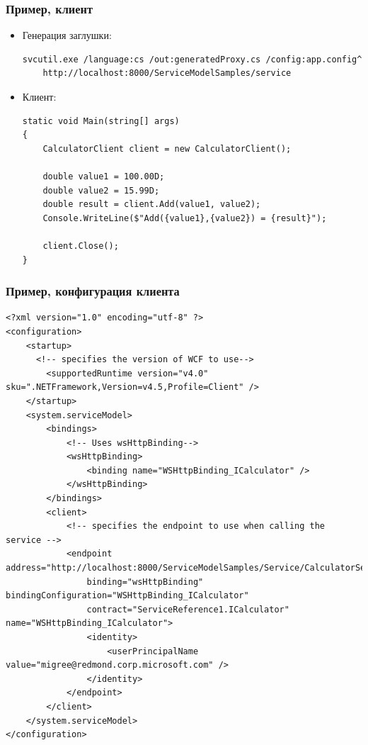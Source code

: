 \documentclass[xetex,mathserif,serif]{beamer}
\begin{document}
	\begin{frame}[fragile]
		\frametitle{Пример, клиент}
		\begin{itemize}
			\item Генерация заглушки: 
				\begin{scriptsize}
					\begin{verbatim}
svcutil.exe /language:cs /out:generatedProxy.cs /config:app.config^
    http://localhost:8000/ServiceModelSamples/service
					\end{verbatim}
				\end{scriptsize}
			\item Клиент:
				\begin{footnotesize}
					\begin{verbatim}
static void Main(string[] args)
{
    CalculatorClient client = new CalculatorClient();

    double value1 = 100.00D;
    double value2 = 15.99D;
    double result = client.Add(value1, value2);
    Console.WriteLine($"Add({value1},{value2}) = {result}");

    client.Close();
}
					\end{verbatim}
				\end{footnotesize}
		\end{itemize}
	\end{frame}

	\begin{frame}[fragile]
		\frametitle{Пример, конфигурация клиента}
		\begin{ssmall}
			\begin{verbatim}
<?xml version="1.0" encoding="utf-8" ?>  
<configuration>  
    <startup>   
      <!-- specifies the version of WCF to use-->  
        <supportedRuntime version="v4.0" sku=".NETFramework,Version=v4.5,Profile=Client" />  
    </startup>  
    <system.serviceModel>  
        <bindings>  
            <!-- Uses wsHttpBinding-->  
            <wsHttpBinding>  
                <binding name="WSHttpBinding_ICalculator" />  
            </wsHttpBinding>  
        </bindings>  
        <client>  
            <!-- specifies the endpoint to use when calling the service -->  
            <endpoint address="http://localhost:8000/ServiceModelSamples/Service/CalculatorService"  
                binding="wsHttpBinding" bindingConfiguration="WSHttpBinding_ICalculator"  
                contract="ServiceReference1.ICalculator" name="WSHttpBinding_ICalculator">  
                <identity>  
                    <userPrincipalName value="migree@redmond.corp.microsoft.com" />  
                </identity>  
            </endpoint>  
        </client>  
    </system.serviceModel>  
</configuration>
			\end{verbatim}
		\end{ssmall}
	\end{frame}
\end{document}
